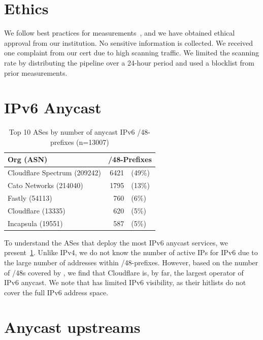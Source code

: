 
\appendices
\section{Ethics}\label{sec:ethics}
We follow best practices for measurements~\cite{ZMapInternetScanner2013}, and we have obtained ethical approval from our institution.
No sensitive information is collected.
We received one complaint from our \gls{cert} due to high scanning traffic.
We limited the scanning rate by distributing the pipeline over a 24-hour period and used a blocklist from prior measurements.

\section{IPv6 Anycast}\label{sec:ipv6-anycast}

\begin{table}[H]
    \centering
    \caption{Top 10 ASes by number of anycast IPv6 /48-prefixes (n=\num{13007})}
    \begin{tabular}{l r@{~}l}
        \toprule
        Org (ASN) & \multicolumn{2}{c}{/48-Prefixes} \\
        \midrule
        Cloudflare Spectrum (209242) & \num{6421} & (49\%) \\
        Cato Networks (214040) & \num{1795} & (13\%) \\
        Fastly (54113) & \num{760} & (6\%) \\
        Cloudflare (13335) & \num{620} & (5\%) \\
        Incapsula (19551) & \num{587} & (5\%) \\
        \bottomrule
    \end{tabular}
    \label{tab:top_ases_v6}
\end{table}

To understand the ASes that deploy the most IPv6 anycast services, we present~\cref{tab:top_ases_v6}.
Unlike IPv4, we do not know the number of active IPs for IPv6 due to the large number of addresses within /48-prefixes.
However, based on the number of /48s covered by \laces, we find that Cloudflare is, by far, the largest operator of IPv6 anycast.
We note that \laces has limited IPv6 visibility, as their hitlists do not cover the full IPv6 address space.

\section{Anycast upstreams}\label{sec:anycast-upstreams}

